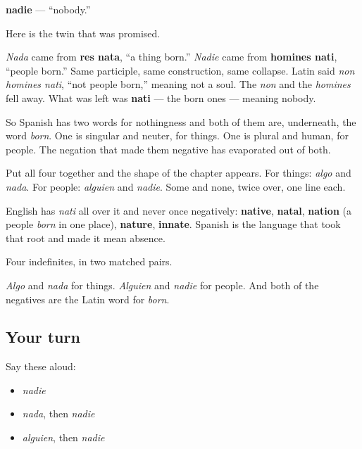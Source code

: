 \begin{cousinweb}
\textbf{nadie} — \textquotedblleft{}nobody.\textquotedblright{}

Here is the twin that was promised.

\emph{Nada} came from \textbf{res nata}, \textquotedblleft{}a thing born.\textquotedblright{} \emph{Nadie} came from \textbf{homines nati}, \textquotedblleft{}people born.\textquotedblright{} Same participle, same construction, same collapse. Latin said \emph{non homines nati}, \textquotedblleft{}not people born,\textquotedblright{} meaning not a soul. The \emph{non} and the \emph{homines} fell away. What was left was \textbf{nati} — the born ones — meaning nobody.

So Spanish has two words for nothingness and both of them are, underneath, the word \emph{born}. One is singular and neuter, for things. One is plural and human, for people. The negation that made them negative has evaporated out of both.

Put all four together and the shape of the chapter appears. For things: \emph{algo} and \emph{nada}. For people: \emph{alguien} and \emph{nadie}. Some and none, twice over, one line each.

English has \emph{nati} all over it and never once negatively: \textbf{native}, \textbf{natal}, \textbf{nation} (a people \emph{born} in one place), \textbf{nature}, \textbf{innate}. Spanish is the language that took that root and made it mean absence.
\end{cousinweb}

\begin{grammarlens}[title={What you've built}]
Four indefinites, in two matched pairs.

\emph{Algo} and \emph{nada} for things. \emph{Alguien} and \emph{nadie} for people. And both of the negatives are the Latin word for \emph{born}.
\end{grammarlens}

\subsection*{Your turn}
Say these aloud:

\begin{itemize}
\raggedright
  \item \emph{nadie}
  \item \emph{nada}, then \emph{nadie}
  \item \emph{alguien}, then \emph{nadie}
\end{itemize}

